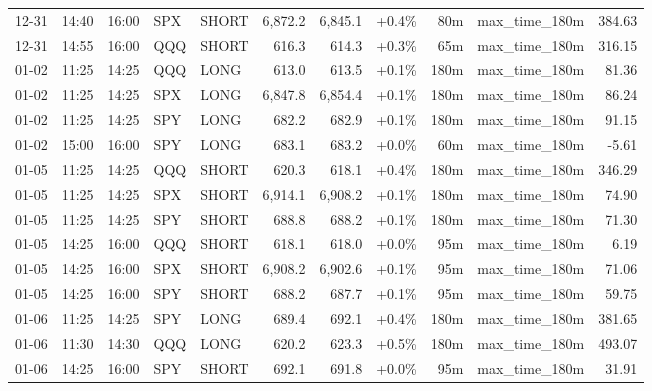 \documentclass[11pt,a4paper,twoside]{article}
\begin{document}
\begin{center}
\begin{longtable}{>{\color{txtmain}}l l l l l r r r r >{\color{txtmain}}l r}
12-31 & 14:40 & 16:00 & SPX & SHORT & 6,872.2 & 6,845.1 & \textcolor{wingreen}{+0.4\%} & 80m & max\_time\_180m & \textcolor{wingreen}{384.63} \\
12-31 & 14:55 & 16:00 & QQQ & SHORT & 616.3 & 614.3 & \textcolor{wingreen}{+0.3\%} & 65m & max\_time\_180m & \textcolor{wingreen}{316.15} \\
01-02 & 11:25 & 14:25 & QQQ & LONG & 613.0 & 613.5 & \textcolor{wingreen}{+0.1\%} & 180m & max\_time\_180m & \textcolor{wingreen}{81.36} \\
01-02 & 11:25 & 14:25 & SPX & LONG & 6,847.8 & 6,854.4 & \textcolor{wingreen}{+0.1\%} & 180m & max\_time\_180m & \textcolor{wingreen}{86.24} \\
01-02 & 11:25 & 14:25 & SPY & LONG & 682.2 & 682.9 & \textcolor{wingreen}{+0.1\%} & 180m & max\_time\_180m & \textcolor{wingreen}{91.15} \\
01-02 & 15:00 & 16:00 & SPY & LONG & 683.1 & 683.2 & \textcolor{wingreen}{+0.0\%} & 60m & max\_time\_180m & \textcolor{lossred}{-5.61} \\
01-05 & 11:25 & 14:25 & QQQ & SHORT & 620.3 & 618.1 & \textcolor{wingreen}{+0.4\%} & 180m & max\_time\_180m & \textcolor{wingreen}{346.29} \\
01-05 & 11:25 & 14:25 & SPX & SHORT & 6,914.1 & 6,908.2 & \textcolor{wingreen}{+0.1\%} & 180m & max\_time\_180m & \textcolor{wingreen}{74.90} \\
01-05 & 11:25 & 14:25 & SPY & SHORT & 688.8 & 688.2 & \textcolor{wingreen}{+0.1\%} & 180m & max\_time\_180m & \textcolor{wingreen}{71.30} \\
01-05 & 14:25 & 16:00 & QQQ & SHORT & 618.1 & 618.0 & \textcolor{wingreen}{+0.0\%} & 95m & max\_time\_180m & \textcolor{wingreen}{6.19} \\
01-05 & 14:25 & 16:00 & SPX & SHORT & 6,908.2 & 6,902.6 & \textcolor{wingreen}{+0.1\%} & 95m & max\_time\_180m & \textcolor{wingreen}{71.06} \\
01-05 & 14:25 & 16:00 & SPY & SHORT & 688.2 & 687.7 & \textcolor{wingreen}{+0.1\%} & 95m & max\_time\_180m & \textcolor{wingreen}{59.75} \\
01-06 & 11:25 & 14:25 & SPY & LONG & 689.4 & 692.1 & \textcolor{wingreen}{+0.4\%} & 180m & max\_time\_180m & \textcolor{wingreen}{381.65} \\
01-06 & 11:30 & 14:30 & QQQ & LONG & 620.2 & 623.3 & \textcolor{wingreen}{+0.5\%} & 180m & max\_time\_180m & \textcolor{wingreen}{493.07} \\
01-06 & 14:25 & 16:00 & SPY & SHORT & 692.1 & 691.8 & \textcolor{wingreen}{+0.0\%} & 95m & max\_time\_180m & \textcolor{wingreen}{31.91} \\

\end{longtable}
\end{center}
\end{document}
